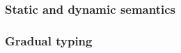 
\subsubsection{Static and dynamic semantics}
\label{sec:static_dynamic_semantics}

\subsubsection{Gradual typing}
\label{sec:gradual}







